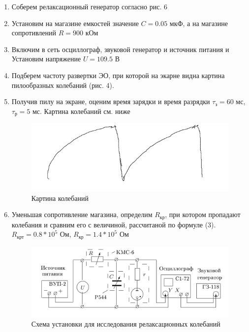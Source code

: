\documentclass[a4paper, 12pt]{article}
\begin{document}
\begin{enumerate}
        \item Соберем релаксационный генератор согласно рис. 6
        \item Установим на магазине емкостей значение $C = 0.05$ мкФ, а на магазине сопротивлений $R = 900$ кОм
        \item Включим в сеть осциллограф, звуковой генератор и источник питания и Установим напряжение $U = 109.5$ В
        \item Подберем частоту развертки ЭО, при которой на экарне видна картина пилообразных колебаний (рис. 4). 
        \item Получив пилу на экране, оценим время зарядки и время разрядки $\tau_з = 60$ мс, $\tau_р = 5$ мс. Картина колебаний см. ниже\\
        
        \begin{figure}
            \includegraphics[scale=0.8]{pic6.jpg}
            \caption{Картина колебаний}
        \end{figure}

        \item Уменьшая сопротивление магазина, определим $R_{кр}$, при котором пропадают колебания и сравним его с величиной, рассчитаной по формуле (3).
        $R_{крт} = 0.8 * 10^5$ Ом, $R_{кр} = 1.4 * 10^5$ Ом
        
        \begin{figure}[!h]
            \includegraphics[scale=0.2]{pic7.jpg}
            \caption{Схема установки для исследования релаксационных колебаний}
        \end{figure}
        

\end{enumerate}
\end{document}
